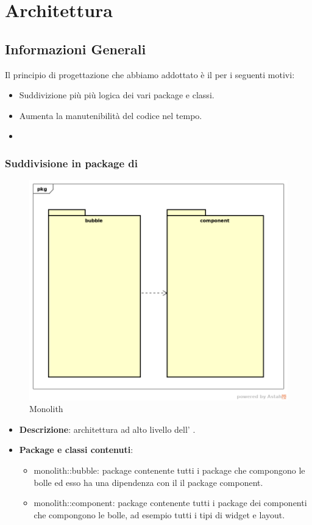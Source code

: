\newpage
\section{Architettura}
\subsection{Informazioni Generali}
Il principio di progettazione che abbiamo addottato è il  per i seguenti motivi:
\begin{itemize}
\item Suddivizione più più logica dei vari package e classi.
\item Aumenta la manutenibilità del codice nel tempo.
\item 
\end{itemize}

\subsubsection{Suddivisione in package  di }
\label{Monolith}
\begin{figure}[H]
	\centering
	\includegraphics[scale=0.5]{Sezioni/imgPackage/Monolith.png}
	\caption{Monolith}
\end{figure}
\begin{itemize}
	\item{\textbf{Descrizione}}: architettura ad alto livello dell'  .
	\item{\textbf{Package e classi contenuti}}:
	\begin{itemize}
	\item{monolith::bubble}: package contenente tutti i package che compongono le bolle ed esso ha una dipendenza con il il package component.
	\item{monolith::component}: package contenente tutti i package dei componenti che compongono le bolle, ad esempio tutti i tipi di widget e layout.
	\end{itemize}
	
\end{itemize}


